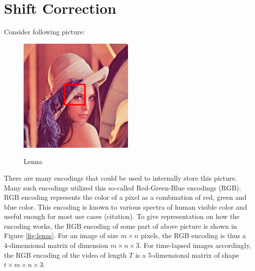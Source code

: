 \documentclass[pdftex,12pt,a4paper]{report}
\begin{document}
\section{Shift Correction}

Consider following picture:

\begin{figure}[h]
\centering
\includegraphics[width=0.5\textwidth]{lenna_marked}
\label{fig:lena}
\caption{Lenna}

\end{figure}

There are many encodings that could be used to internally store this picture. Many such encodings utilized this so-called Red-Green-Blue encodings (RGB). RGB encoding represents the color of a pixel as a combination of red, green and blue color. This encoding is known to various spectra of human visible color and useful enough for most use cases (citation). To give representation on how the encoding works, the RGB encoding of some part of above picture is shown in Figure \ref{fig:lenas}. For an image of size $m \times n$ pixels, the RGB encoding is thus a 4-dimensional matrix of dimension $m \times n \times 3$. For time-lapsed images accordingly, the RGB encoding of the video of length $T$ is a 5-dimensional matrix of shape $t \times m \times n \times 3$.

\end{document}
